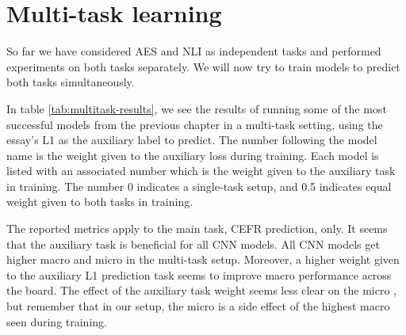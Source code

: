 \chapter{Multi-task learning}

So far we have considered \ac{AES} and \ac{NLI} as independent tasks and
performed experiments on both tasks separately. We will now try to train
models to predict both tasks simultaneously.

In table \ref{tab:multitask-results}, we see the results of running some of
the most successful models from the previous chapter in a multi-task setting,
using the essay's L1 as the auxiliary label to predict. The number following
the model name is the weight given to the auxiliary loss during training.
Each model is listed with an associated number which is the weight given to
the auxiliary task in training. The number 0 indicates a single-task setup,
and 0.5 indicates equal weight given to both tasks in training.

The reported metrics apply to the main task, CEFR prediction, only. It seems
that the auxiliary task is beneficial for all CNN models. All CNN models get
higher macro and micro \FI in the multi-task setup. Moreover, a higher weight
given to the auxiliary L1 prediction task seems to improve macro \FI
performance across the board. The effect of the auxiliary task weight seems
less clear on the micro \FI, but remember that in our setup, the micro \FI is
a side effect of the highest macro \FI seen during training.


